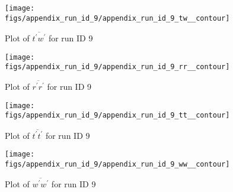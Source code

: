 \begin{figure}[H]
\centering
\texttt{[image: figs/appendix\_run\_id\_9/appendix\_run\_id\_9\_tw\_\_contour]}
\caption{Plot of $\overline{t^\prime w^\prime}$ for run ID 9}
\label{fig:appendix_run_id_9_tw__contour}
\end{figure}


\begin{figure}[H]
\centering
\texttt{[image: figs/appendix\_run\_id\_9/appendix\_run\_id\_9\_rr\_\_contour]}
\caption{Plot of $\overline{r^\prime r^\prime}$ for run ID 9}
\label{fig:appendix_run_id_9_rr__contour}
\end{figure}


\begin{figure}[H]
\centering
\texttt{[image: figs/appendix\_run\_id\_9/appendix\_run\_id\_9\_tt\_\_contour]}
\caption{Plot of $\overline{t^\prime t^\prime}$ for run ID 9}
\label{fig:appendix_run_id_9_tt__contour}
\end{figure}


\begin{figure}[H]
\centering
\texttt{[image: figs/appendix\_run\_id\_9/appendix\_run\_id\_9\_ww\_\_contour]}
\caption{Plot of $\overline{w^\prime w^\prime}$ for run ID 9}
\label{fig:appendix_run_id_9_ww__contour}
\end{figure}


